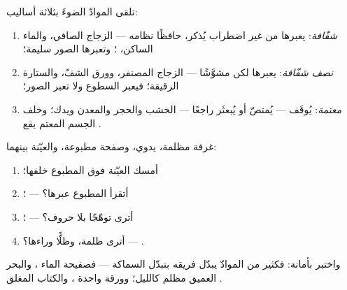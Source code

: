 \begin{definition}\label{def:g7:light-sources-propagation:coats}
تلقى الموادّ الضوءَ بثلاثة أساليب:
\begin{enumerate}
  \item \emph{شفّافة}: يعبرها  من غير اضطراب
        يُذكر، حافظًا نظامه --- الزجاج الصافي، والماء الساكن،
        ؛ وتعبرها الصور سليمة؛
  \item \emph{نصف شفّافة}: يعبرها  لكن
        مشوَّشًا --- الزجاج المصنفر، وورق الشفّ، والستارة
        الرقيقة؛ فيعبر السطوع ولا تعبر الصور؛
  \item \emph{معتمة}: يُوقَف  --- يُمتصّ أو
        يُبعثَر راجعًا --- الخشب والحجر والمعدن ويدك؛ وخلف
        الجسم المعتم يقع .
\end{enumerate}
\end{definition}

\begin{method}\label{met:g7:light-sources-propagation:sort}
غرفة مظلمة،  يدوي، وصفحة مطبوعة، والعيّنة بينهما:
\begin{enumerate}
  \item أمسك العيّنة فوق المطبوع  خلفها؛
  \item أتقرأ المطبوع عبرها؟ --- ؛
  \item أترى توهّجًا بلا حروف؟ --- ؛
  \item أترى ظلمة، وظلًّا وراءها؟ --- .
\end{enumerate}
واختبر بأمانة: فكثير من الموادّ يبدّل فريقه بتبدّل السماكة ---
فصفيحة الماء ، والبحر العميق مظلم كالليل؛ وورقة واحدة
، والكتاب المغلق .
\end{method}

